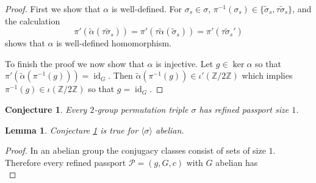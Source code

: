 \documentclass{dcthesis}
\newcommand{\ZZ}{\mathbb Z}
\newcommand{\mm}[1]{{\color{blue} \sf MM: [#1]}}
\newcommand{\wt}[1]{\widetilde{#1}}
\renewcommand{\ker}{\operatorname{ker}}
\DeclareMathOperator{\id}{id}
\numberwithin{equation}{section}
\newtheorem{conj}[equation]{Conjecture}
\newtheorem{lemma}[equation]{Lemma}
\theoremstyle{definition}
\theoremstyle{remark}
\begin{document}
{{{\begin{proof}
      First we show that $\alpha$ is well-defined.
      For $\sigma_s\in\sigma$,
      $\pi^{-1}(\sigma_s)
      \in\{\wt{\sigma}_s,\tau\wt{\sigma}_s\}$,
      and the calculation
      \begin{equation}
        \label{eqn:alphawelldefined}
        \pi'(\wt{\alpha}(\tau\wt{\sigma}_s))
        =\pi'(\tau\wt{\alpha}(\wt{\sigma}_s))
        =\pi'(\tau\wt{\sigma}_s')
      \end{equation}
      shows that $\alpha$ is well-defined
      homomorphism.
      \par
      To finish the proof we now show that
      $\alpha$ is injective.
      Let $g\in\ker\alpha$
      so that
      $\pi'(\wt{\alpha}(\pi^{-1}(g)))=\id_G$.
      Then
      $\wt{\alpha}(\pi^{-1}(g))\in
      \iota'(\ZZ/2\ZZ)$
      which implies
      $\pi^{-1}(g)\in\iota(\ZZ/2\ZZ)$
      so that $g=\id_G$.
    \end{proof}
    \begin{conj}
      \label{conj:refinedpassportsizeone}
      Every $2$-group permutation triple $\sigma$
      has refined passport size $1$.
    \end{conj}
    \begin{lemma}
      \label{lem:conjectureabelian}
      Conjecture
      \ref{conj:refinedpassportsizeone}
      is true for
      $\langle\sigma\rangle$
      abelian.
    \end{lemma}
    \begin{proof}
      In an abelian group the conjugacy classes
      consist of sets of size $1$.
      Therefore every refined passport
      $\mathscr{P}=(g,G,c)$
      with $G$ abelian has
      \begin{equation}

\end{equation}
\end{proof}}}}
\end{document}

